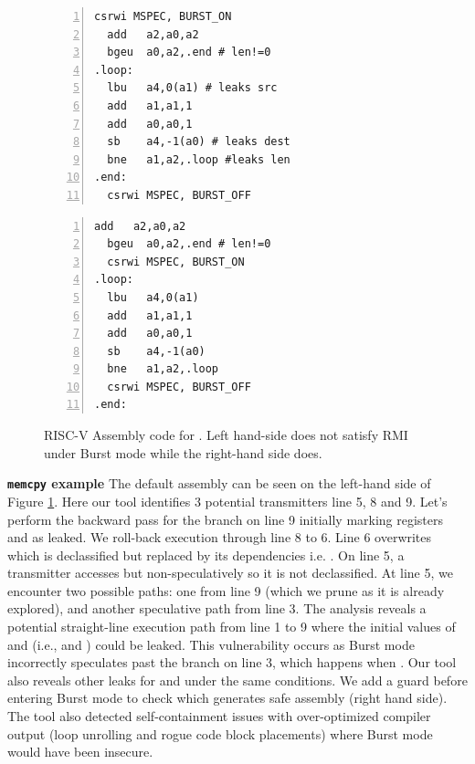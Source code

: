 \begin{figure}[htbp]
\begin{minipage}[]{0.25\textwidth}
\begin{lstlisting}[language={[RISC-V]Assembler},
  numbers=left,
  numberstyle=\tiny,
  numbersep=5pt]
  csrwi MSPEC, BURST_ON
  add	a2,a0,a2
  bgeu	a0,a2,.end # len!=0
.loop:
  lbu	a4,0(a1) # leaks src
  add	a1,a1,1
  add	a0,a0,1
  sb	a4,-1(a0) # leaks dest
  bne	a1,a2,.loop #leaks len
.end:
  csrwi MSPEC, BURST_OFF
\end{lstlisting}
\end{minipage}
\begin{minipage}[]{0.22\textwidth}
\begin{lstlisting}[language={[RISC-V]Assembler},
  numbers=left,
  numberstyle=\tiny,
  numbersep=5pt]
  add	a2,a0,a2
  bgeu	a0,a2,.end # len!=0
  csrwi MSPEC, BURST_ON
.loop:
  lbu	a4,0(a1)
  add	a1,a1,1
  add	a0,a0,1
  sb	a4,-1(a0)
  bne	a1,a2,.loop
  csrwi MSPEC, BURST_OFF
.end:
\end{lstlisting}
\end{minipage}
\caption{RISC-V Assembly code for 
. Left hand-side does not satisfy RMI under Burst mode while the right-hand side does.}
\label{fig:memcpy-assembly}
\end{figure}

\noindent\textbf{\texttt{memcpy} example}
The default assembly can be seen on the left-hand side of Figure \ref{fig:memcpy-assembly}.
Here our tool identifies 3 potential transmitters line 5, 8 and 9.
Let's perform the backward pass for the branch on line 9 initially marking registers  and  as leaked.
We roll-back execution through line 8 to 6.
Line 6 overwrites  which is declassified but replaced by its dependencies i.e. .
On line 5, a transmitter accesses  but non-speculatively so it is not declassified.
At line 5, we encounter two possible paths: one from line 9 (which we prune as it is already explored), and another speculative path from line 3.
The analysis reveals a potential straight-line execution path from line 1 to 9 where the initial values of  and  (i.e.,  and ) could be leaked.
This vulnerability occurs as Burst mode incorrectly speculates past the branch on line 3, which happens when .
Our tool also reveals other leaks for  and  under the same conditions.
We add a guard before entering Burst mode to check  which generates safe assembly (right hand side).
The tool also detected self-containment issues with over-optimized compiler output (loop unrolling and rogue code block placements) where Burst mode would have been insecure.

